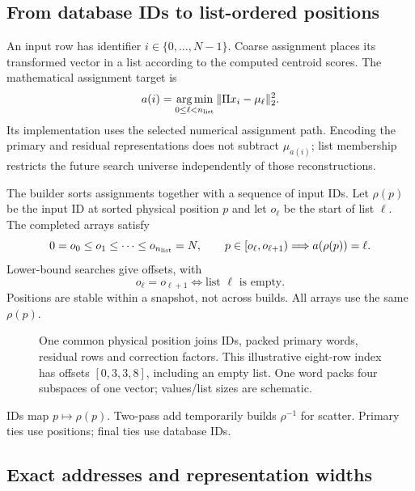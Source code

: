 \subsection{From database IDs to list-ordered positions}

An input row has identifier $i\in\{0,\ldots,N-1\}$. Coarse assignment
places its transformed vector in a list according to the computed
centroid scores. The mathematical assignment target is
\begin{equation}
 a(i)=\operatorname*{arg\,min}_{0\leq\ell<n_{\rm list}}
       \|\Pi x_i-\mu_\ell\|_2^2.
 \label{eq:4-assignment}
\end{equation}
Its implementation uses the selected numerical assignment path. Encoding
the primary and residual representations does not subtract $\mu_{a(i)}$;
list membership restricts the future search universe independently of
those reconstructions.

The builder sorts assignments together with a sequence of input IDs.
Let $\rho(p)$ be the input ID at sorted physical position $p$ and let
$o_\ell$ be the start of list $\ell$. The completed arrays satisfy
\begin{equation}
 0=o_0\leq o_1\leq\cdots\leq o_{n_{\rm list}}=N,
 \qquad p\in[o_\ell,o_{\ell+1})\Longrightarrow a(\rho(p))=\ell.
 \label{eq:4-offsets}
\end{equation}
Lower-bound searches give offsets, with
\[
 o_\ell=o_{\ell+1}\Longleftrightarrow\text{list }\ell\text{ is empty}.
\]
Positions are stable within a snapshot, not across builds. All arrays use the same $\rho(p)$.

\begin{figure}[tbp]
\centering

\caption[List-ordered physical index layout]{One common physical position joins IDs, packed primary words,
residual rows and correction factors. This illustrative eight-row index
has offsets $[0,3,3,8]$, including an empty list. One word packs four subspaces of one vector; values/list sizes are schematic.}
\label{fig:4-layout}
\end{figure}

IDs map $p\mapsto\rho(p)$. Two-pass add temporarily builds $\rho^{-1}$ for scatter. Primary ties use positions; final ties use database IDs.

\subsection{Exact addresses and representation widths}

